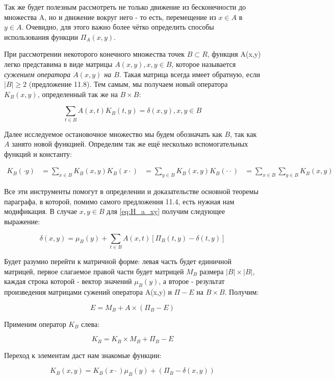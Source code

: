 Так же будет полезным рассмотреть не только движение из бесконечности до множества A, но и движение вокруг него - то есть, перемещение 
из $x \in A$ в $y \in A$. Очевидно, для этого важно более чётко определить способы использования функции $\Pi_A(x,y)$.

При рассмотрении некоторого конечного множества точек $B \subset R$, функция A(x,y) легко представима в виде матрицы ${A(x,y)}, x,y \in B$, которое называется 
\textit{сужением оператора $A(x,y)$ на $B$}. Такая матрица всегда имеет обратную, если $|B| \geq 2$ (предложение 11.8). Тем самым, мы получаем новый оператора
$K_B(x,y)$, определенный так же на $B \times B$:

\begin{equation}
 \sum_{t \in B} A(x,t) K_B(t,y) = \delta(x,y), x,y \in B
\label{eq_K_B} 
\end{equation}

Далее исследуемое остановочное множество мы будем обозначать как $B$, так как $A$ занято новой функцией.
Определим так же ещё несколько вспомогательных функций и константу:

\begin{align*} 
K_B(\cdot y) &= \sum_{x \in B} K_B(x,y)
K_B(x \cdot) &= \sum_{y \in B} K_B(x,y)
K_B(\cdot \cdot) &= \sum_{x \in B} \sum_{y \in B} K_B(x,y)
\end{align*}

Все эти инструменты помогут в определении и доказательстве основной теоремы параграфа, в которой, помимо самого предложения 11.4, есть нужная нам модификация.
В случае $x,y \in B$ для \ref{eq:H_a_xy} получим следующее выражение:

\[ \delta(x,y) = \mu_B(y) + \sum_{t \in B} A(x,t)[\Pi_B(t,y)-\delta(t,y)] \] 

Будет разумно перейти к матричной форме: левая часть будет единичной матрицей, первое слагаемое правой части будет матрицей $M_B$ размера $|B| \times |B|$, 
каждая строка которой - вектор значений $\mu_B(y)$, а второе - результат произведения матрицами сужений оператора A(x,y) и $\Pi - E$ на $B \times B$. Получим:

\[ E = M_B + A \times (\Pi_B - E) \]

Применим оператор $K_B$ слева:

\[ K_B = K_B \times M_B + \Pi_B - E \]

Переход к элементам даст нам знакомые функции:

\[ K_B(x, y) = K_B(x \cdot) \mu_B(y) + (\Pi_B - \delta(x,y))\] 

